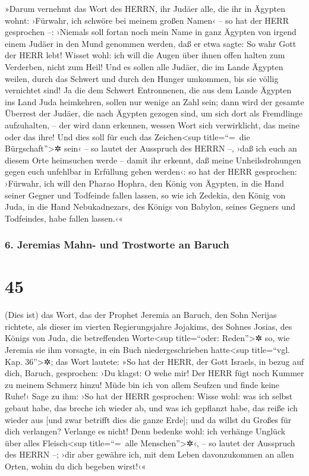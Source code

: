 »Darum vernehmt das Wort des HERRN, ihr Judäer alle, die
ihr in Ägypten wohnt: ›Fürwahr, ich schwöre bei meinem großen Namen‹ --
so hat der HERR gesprochen --: ›Niemals soll fortan noch mein Name in
ganz Ägypten von irgend einem Judäer in den Mund genommen werden, daß er
etwa sagte: So wahr Gott der HERR lebt! Wisset wohl: ich
will die Augen über ihnen offen halten zum Verderben, nicht zum Heil!
Und es sollen alle Judäer, die im Lande Ägypten weilen, durch das
Schwert und durch den Hunger umkommen, bis sie völlig vernichtet sind!
Ja die dem Schwert Entronnenen, die aus dem Lande Ägypten
ins Land Juda heimkehren, sollen nur wenige an Zahl sein; dann wird der
gesamte Überrest der Judäer, die nach Ägypten gezogen sind, um sich dort
als Fremdlinge aufzuhalten, -- der wird dann erkennen, wessen Wort sich
verwirklicht, das meine oder das ihre! Und dies soll für
euch das Zeichen\textless sup title=``=~die Bürgschaft''\textgreater✲
sein‹ -- so lautet der Ausspruch des HERRN --, ›daß ich euch an diesem
Orte heimsuchen werde -- damit ihr erkennt, daß meine Unheilsdrohungen
gegen euch unfehlbar in Erfüllung gehen werden‹: so hat
der HERR gesprochen: ›Fürwahr, ich will den Pharao Hophra, den König von
Ägypten, in die Hand seiner Gegner und Todfeinde fallen lassen, so wie
ich Zedekia, den König von Juda, in die Hand Nebukadnezars, des Königs
von Babylon, seines Gegners und Todfeindes, habe fallen lassen.‹«

\hypertarget{jeremias-mahn--und-trostworte-an-baruch}{%
\subsubsection{6. Jeremias Mahn- und Trostworte an
Baruch}\label{jeremias-mahn--und-trostworte-an-baruch}}

\hypertarget{section-44}{%
\section{45}\label{section-44}}

(Dies ist) das Wort, das der Prophet Jeremia an Baruch,
den Sohn Nerijas richtete, als dieser im vierten Regierungsjahre
Jojakims, des Sohnes Josias, des Königs von Juda, die betreffenden
Worte\textless sup title=``oder: Reden''\textgreater✲ so, wie Jeremia
sie ihm vorsagte, in ein Buch niedergeschrieben hatte\textless sup
title=``vgl. Kap. 36''\textgreater✲; das Wort lautete: »So
hat der HERR, der Gott Israels, in bezug auf dich, Baruch, gesprochen:
›Du klagst: O wehe mir! Der HERR fügt noch Kummer zu
meinem Schmerz hinzu! Müde bin ich von allem Seufzen und finde keine
Ruhe!‹ Sage zu ihm: ›So hat der HERR gesprochen: Wisse
wohl: was ich selbst gebaut habe, das breche ich wieder ab, und was ich
gepflanzt habe, das reiße ich wieder aus {[}und zwar betrifft dies die
ganze Erde{]}; und da willst du Großes für dich verlangen?
Verlange es nicht! Denn bedenke wohl: ich verhänge Unglück über alles
Fleisch\textless sup title=``=~alle Menschen''\textgreater✲‹, -- so
lautet der Ausspruch des HERRN --; ›dir aber gewähre ich, mit dem Leben
davonzukommen an allen Orten, wohin du dich begeben wirst!‹«

